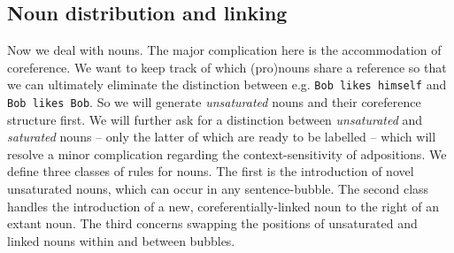 \subsection{Noun distribution and linking}



Now we deal with nouns. The major complication here is the accommodation of coreference. We want to keep track of which (pro)nouns share a reference so that we can ultimately eliminate the distinction between e.g. \texttt{Bob likes himself} and \texttt{Bob likes Bob}. So we will generate \emph{unsaturated} nouns and their coreference structure first. We will further ask for a distinction between \emph{unsaturated} and \emph{saturated} nouns -- only the latter of which are ready to be labelled -- which will resolve a minor complication regarding the context-sensitivity of adpositions. We define three classes of rules for nouns. The first is the introduction of novel unsaturated nouns, which can occur in any sentence-bubble. The second class handles the introduction of a new, coreferentially-linked noun to the right of an extant noun. The third concerns swapping the positions of unsaturated and linked nouns within and between bubbles.

